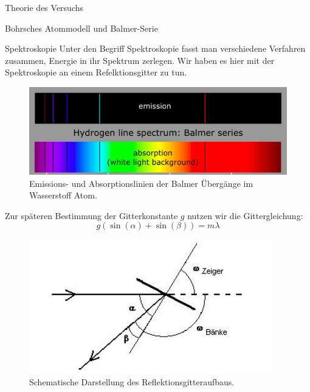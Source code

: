 \documentclass[pdftex, a4paper,11pt, twoside, ngerman]{report}
\begin{document}
\begin{chapter}{Theorie des Versuchs}
\begin{section}{Bohrsches Atommodell und Balmer-Serie}
      
      
      \begin{subsection}{Spektroskopie}
        \label{chp:TheorieBohrBalmerSerieSpektroskopie}
        Unter den Begriff Spektroskopie fasst man verschiedene Verfahren zusammen, Energie in ihr Spektrum zerlegen.
        Wir haben es hier mit der Spektroskopie an einem Refelktionsgitter zu tun.
        \begin{figure}[b]
          \begin{center}
            \includegraphics[width=.95\textwidth]{Figures/BalmerserieEmissionAbsorption.png}
            \caption{Emissions- und Absorptionslinien der Balmer Übergänge im Wasserstoff Atom.\cite{bib:BalmerserieEmissionAbsorption}}\label{fig:BalmerserieEmissionAbsorption}
          \end{center}
        \end{figure}
        Zur späteren Bestimmung der Gitterkonstante $g$ nutzen wir die Gittergleichung:
        \begin{equation}
          \label{eq:Gittergleichung}
          g(\sin(\alpha)+\sin(\beta))=m\lambda
        \end{equation}
        
        \begin{figure}[htbp]
          \begin{center}
            \includegraphics[width=.8\textwidth]{Figures/Gitteraufbau.png}
            \caption{Schematische Darstellung des Reflektionsgitteraufbaus.\cite{bib:LDDidactic}}\label{fig:Gitteraufbau}
          \end{center}
        \end{figure}
        

\end{subsection}
\end{section}
\end{chapter}
\end{document}
